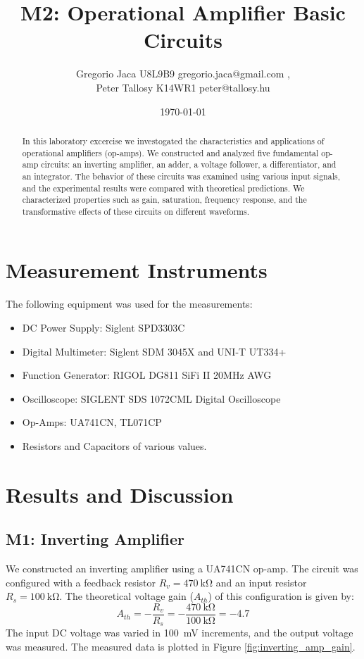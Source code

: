 \documentclass[12pt,a4paper]{article}
\title{M2: Operational Amplifier Basic Circuits}
\author{Gregorio Jaca U8L9B9 gregorio.jaca@gmail.com , \\ Peter Tallosy K14WR1 peter@tallosy.hu }
\date{\today}
\begin{document}
\maketitle

\begin{abstract}
In this laboratory excercise we investogated the characteristics and applications of operational amplifiers (op-amps). We constructed and analyzed five fundamental op-amp circuits: an inverting amplifier, an adder, a voltage follower, a differentiator, and an integrator. The behavior of these circuits was examined using various input signals, and the experimental results were compared with theoretical predictions. We characterized properties such as gain, saturation, frequency response, and the transformative effects of these circuits on different waveforms.
\end{abstract}

\section{Measurement Instruments}
The following equipment was used for the measurements:
\begin{itemize}
    \item DC Power Supply: Siglent SPD3303C
    \item Digital Multimeter: Siglent SDM 3045X and UNI-T UT334+
    \item Function Generator: RIGOL DG811 SiFi II 20MHz AWG
    \item Oscilloscope: SIGLENT SDS 1072CML Digital Oscilloscope
    \item Op-Amps: UA741CN, TL071CP
    \item Resistors and Capacitors of various values.
\end{itemize}

\section{Results and Discussion}

\subsection{M1: Inverting Amplifier}
We constructed an inverting amplifier using a UA741CN op-amp. The circuit was configured with a feedback resistor \(R_v = \SI{470}{\kilo\ohm}\) and an input resistor \(R_s = \SI{100}{\kilo\ohm}\). The theoretical voltage gain (\(A_{th}\)) of this configuration is given by:
\begin{equation}
    A_{th} = -\frac{R_v}{R_s} = -\frac{\SI{470}{\kilo\ohm}}{\SI{100}{\kilo\ohm}} = -4.7
\end{equation}
The input DC voltage was varied in \SI{100}{\milli\volt} increments, and the output voltage was measured. The measured data is plotted in Figure \ref{fig:inverting_amp_gain}.
\end{document}
